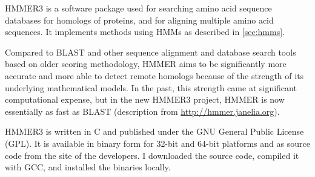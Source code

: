 HMMER3  \citep{eddy2011} is a software package used for searching amino acid
sequence databases for homologs of proteins, and for aligning multiple amino
acid sequences. It implements methods using HMMs as described in
\autoref{sec:hmms}.

Compared to BLAST and other sequence alignment and database search tools based
on older scoring methodology, HMMER aims to be significantly more accurate and
more able to detect remote homologs because of the strength of its underlying
mathematical models. In the past, this strength came at significant
computational expense, but in the new HMMER3 project, HMMER is now essentially
as fast as BLAST (description from \url{http://hmmer.janelia.org}).

HMMER3 is written in C and published under the GNU General Public License (GPL).
It is available in binary form for 32-bit and 64-bit platforms and as source
code from the site of the developers. I downloaded the source code, compiled it
with GCC, and installed the binaries locally. 
